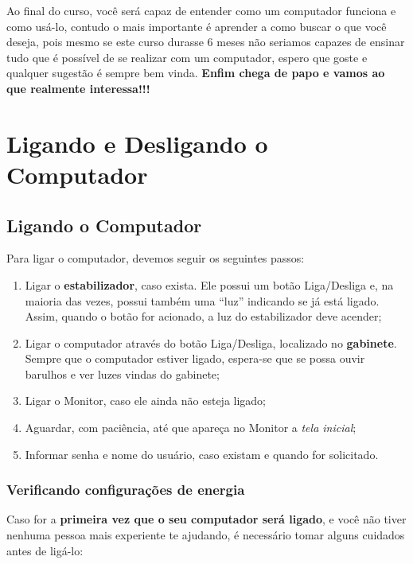 \documentclass[hidelinks,12pt]{article}
\begin{document}
 Ao final do curso, você será capaz de entender como um computador funciona e como usá-lo, contudo o mais importante é aprender a como buscar o que você deseja, pois mesmo se este curso durasse 6 meses não seriamos capazes de ensinar tudo que é possível de se realizar com um computador, espero que goste e qualquer sugestão é sempre bem vinda. \textbf{Enfim chega de papo e vamos ao que realmente interessa!!!}


\section{Ligando e Desligando o Computador}
\label{Ligando e Desligando o Computador}

\subsection{Ligando o Computador}
\label{Ligando o Computador}

	
Para ligar o computador, devemos seguir os seguintes passos:
	
\begin{enumerate}
	\item Ligar o \textbf{estabilizador}, caso exista. Ele possui um botão Liga/Desliga e, na maioria das vezes, possui também uma ``luz'' indicando se já está ligado. Assim, quando o botão for acionado, a luz do estabilizador deve acender;

	\item Ligar o computador através do botão Liga/Desliga, localizado no \textbf{gabinete}. Sempre que o computador estiver ligado, espera-se que se possa ouvir barulhos e ver luzes vindas do gabinete;

    \item Ligar o Monitor, caso ele ainda não esteja ligado;

	\item Aguardar, com paciência, até que apareça no Monitor a \emph{tela inicial};

	\item Informar senha e nome do usuário, caso existam e quando for solicitado.
\end{enumerate}


\subsubsection{Verificando configurações de energia}

Caso for a \textbf{primeira vez que o seu computador será ligado}, e você não tiver nenhuma pessoa mais experiente te ajudando, é necessário tomar alguns cuidados antes de ligá-lo:
\end{document}
